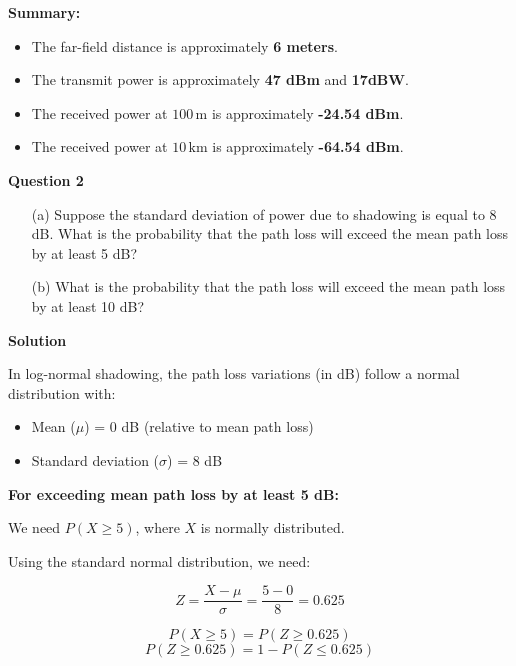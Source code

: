 \documentclass[12pt]{article}
\begin{document}
\begin{flushleft}
\begin{enumerate}
		\end{enumerate}
		
		\textbf{Summary:}
		\begin{itemize}
			\item The far-field distance is approximately \textbf{6 meters}.
			\item The transmit power is approximately \textbf{47 dBm} and \textbf{17dBW}.
			\item The received power at \(100 \, \text{m}\) is approximately \textbf{-24.54 dBm}.
			\item The received power at \(10 \, \text{km}\) is approximately \textbf{-64.54 dBm}.
		\end{itemize}
		\newpage
		
		
		\textbf{Question 2}
		\begin{enumerate}
			\item[(a)] Suppose the standard deviation of power due to shadowing is equal to 8 dB. What is the probability that the path loss will exceed the mean path loss by at least 5 dB?
			
			\item[(b)] What is the probability that the path loss will exceed the mean path loss by at least 10 dB?
		\end{enumerate}
		
		\textbf{Solution}
		
	\end{flushleft}
	
	
	In log-normal shadowing, the path loss variations (in dB) follow a normal distribution with:
	
	\begin{itemize}
		\item Mean (\(\mu\)) = 0 dB (relative to mean path loss)
		\item Standard deviation (\(\sigma\)) = 8 dB
	\end{itemize}
	
	\vspace{0.5cm}
	
	\textbf{For exceeding mean path loss by at least 5 dB:}
	
	We need \(P(X \geq 5)\), where \(X\) is normally distributed.
	
	Using the standard normal distribution, we need:
	
	\[Z = \frac{X - \mu}{\sigma} = \frac{5 - 0}{8} = 0.625\]
	
	\[P(X \geq 5) = P(Z \geq 0.625)	\]
	\[	P(Z \geq 0.625) = 1 - P(Z \leq 0.625)\]
	
\end{document}
